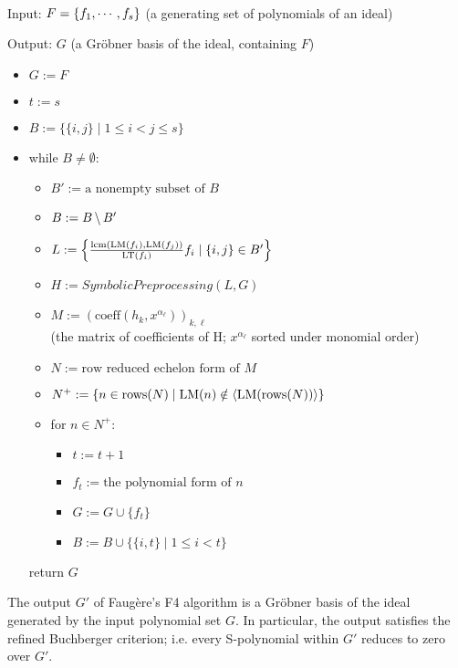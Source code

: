 \begin{definition}
    \label{def:FaugereF4}
    \leanok
    ~\\
    
    Input: \(F = \{ f_1, \cdots, f_s \}\)
    (a generating set of polynomials of an ideal)

    Output: \(G\) (a Gr\"obner basis of the ideal, containing \(F\))

    \begin{itemize}
        \item[] \(G := F\)
        \item[] \(t := s\)
        \item[] \(B := \{\{i, j\} \mid 1 \le i < j \le s\}\)
        \item[] while \(B \ne \emptyset\):
            \begin{itemize}
                \item[] \(B' := \textrm{a nonempty subset of } B\)
                \item[] \(B := B \,\backslash\, B'\)
                \item[] \(L := \left\{\frac{\mathrm{lcm}(\mathrm{LM}(f_i), \mathrm{LM}(f_j))}{\mathrm{LT}(f_i)} f_i \mid \{i, j\} \in B' \right\}\)
                \item[] \(H := SymbolicPreprocessing(L, G)\)
                \item[] \(M := (\mathrm{coeff}(h_k, x^{\alpha_\ell}))_{k, \ell}\)\\
                (the matrix of coefficients of H; \(x^{\alpha_\ell}\) sorted under monomial order)
                \item[] \(N := \textrm{row reduced echelon form of } M\)
                \item[] \(N^+ := \{n \in \mathrm{rows}(N) \mid \mathrm{LM}(n) \notin \left< \mathrm{LM}(\mathrm{rows}(N)) \right>\}\)
                \item[] for \(n \in N^+\):
                    \begin{itemize}
                        \item[] \(t := t + 1\)
                        \item[] \(f_t := \textrm{the polynomial form of } n\)
                        \item[] \(G := G \cup \{f_t\}\)
                        \item[] \(B := B \cup \{\{i, t\} \mid 1 \le i < t\}\)
                    \end{itemize}
            \end{itemize}
        return \(G\)
    \end{itemize}
\end{definition}

\begin{theorem}[Result of F4]
    \label{def:FaugereF4Result}
    The output \(G'\) of Faug\`ere's F4 algorithm is a Gr\"obner basis of the ideal
    generated by the input polynomial set \(G\). In particular, the output
    satisfies the refined Buchberger criterion; i.e. every S-polynomial within
    \(G'\) reduces to zero over \(G'\).
\end{theorem}